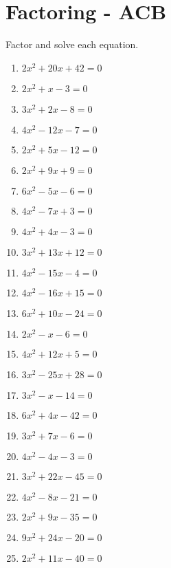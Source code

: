 \documentclass{article}
\begin{document}
\newpage
\section{Factoring - ACB}
Factor and solve each equation. \\
\begin{enumerate}
\item $2x^{2} + 20x + 42 = 0$
\item $2x^{2} + x - 3 = 0$
\item $3x^{2} + 2x - 8 = 0$
\item $4x^{2} - 12x - 7 = 0$
\item $2x^{2} + 5x - 12 = 0$
\item $2x^{2} + 9x + 9 = 0$
\item $6x^{2} - 5x - 6 = 0$
\item $4x^{2} - 7x + 3 = 0$
\item $4x^{2} + 4x - 3 = 0$
\item $3x^{2} + 13x + 12 = 0$
\item $4x^{2} - 15x - 4 = 0$
\item $4x^{2} - 16x + 15 = 0$
\item $6x^{2} + 10x - 24 = 0$
\item $2x^{2} - x - 6 = 0$
\item $4x^{2} + 12x + 5 = 0$
\item $3x^{2} - 25x + 28 = 0$
\item $3x^{2} - x - 14 = 0$
\item $6x^{2} + 4x - 42 = 0$
\item $3x^{2} + 7x - 6 = 0$
\item $4x^{2} - 4x - 3 = 0$
\item $3x^{2} + 22x - 45 = 0$
\item $4x^{2} - 8x - 21 = 0$
\item $2x^{2} + 9x - 35 =0$
\item $9x^{2} + 24x - 20 = 0$
\item $2x^{2} + 11x - 40 = 0$
\end{enumerate}
\end{document}
